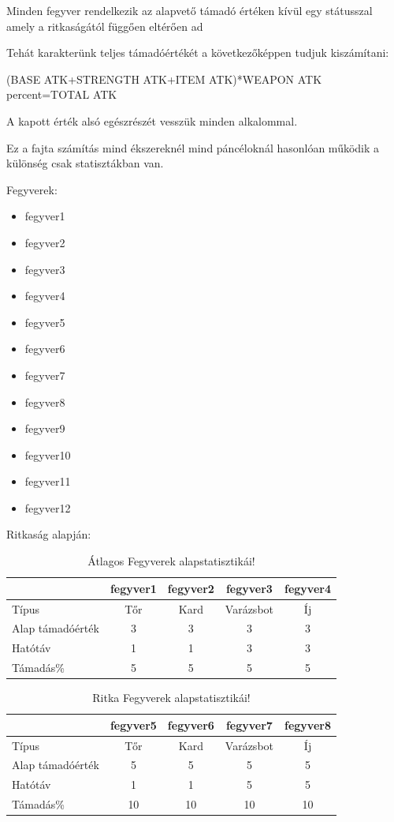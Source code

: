 Minden fegyver rendelkezik az alapvető támadó értéken kívül egy státusszal amely a ritkaságától függően eltérően ad %

Tehát karakterünk teljes támadóértékét a következőképpen tudjuk kiszámítani:

(BASE ATK+STRENGTH ATK+ITEM ATK)*WEAPON ATK percent=TOTAL ATK

A kapott érték alsó egészrészét vesszük minden alkalommal.

Ez a fajta számítás mind ékszereknél mind páncéloknál hasonlóan működik a különség csak  statisztákban van.

Fegyverek:
\begin{itemize}
  \item fegyver1
  \item fegyver2
  \item fegyver3
  \item fegyver4
  \item fegyver5
  \item fegyver6
  \item fegyver7
  \item fegyver8
  \item fegyver9
  \item fegyver10
  \item fegyver11
  \item fegyver12
\end{itemize}
\newpage
Ritkaság alapján:

\begin{table}[h]
\centering
\caption{Átlagos Fegyverek alapstatisztikái!}
\label{tab:minta}
\begin{tabular}{|l|c|c|c|c|}
\hline
 & fegyver1 & fegyver2 & fegyver3 & fegyver4 \\
\hline
Típus & Tőr & Kard & Varázsbot & Íj  \\
\hline
Alap támadóérték & 3 & 3 & 3 & 3 \\
\hline
Hatótáv & 1 & 1 & 3 & 3 \\
\hline
Támadás\% & 5 & 5 & 5 & 5 \\
\hline
\end{tabular}
\end{table}

\begin{table}[h]
\centering
\caption{Ritka Fegyverek alapstatisztikái!}
\label{tab:minta}
\begin{tabular}{|l|c|c|c|c|}
\hline
 & fegyver5 & fegyver6 & fegyver7 & fegyver8   \\
\hline
Típus & Tőr & Kard & Varázsbot & Íj  \\
\hline
Alap támadóérték & 5 & 5 & 5 & 5  \\
\hline
Hatótáv & 1 & 1 & 5 & 5 \\
\hline
Támadás\% & 10 & 10 & 10 & 10\\
\hline
\end{tabular}
\end{table}

